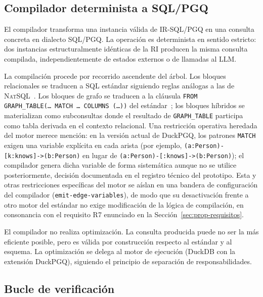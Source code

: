 \subsection{Compilador determinista a SQL/PGQ}
\label{subsec:prop-compilador}

El compilador transforma una instancia válida de IR-SQL/PGQ en una consulta concreta en dialecto \ac{SQL}/\ac{PGQ}. La operación es determinista en sentido estricto: dos instancias estructuralmente idénticas de la \ac{RI} producen la misma consulta compilada, independientemente de estados externos o de llamadas al \ac{LLM}.

La compilación procede por recorrido ascendente del árbol. Los bloques relacionales se traducen a \ac{SQL} estándar siguiendo reglas análogas a las de \textsc{NatSQL}~\cite{gan2021natsql}.
Los bloques de grafo se traducen a la cláusula \texttt{FROM GRAPH\_TABLE(\ldots\ MATCH \ldots\ COLUMNS (\ldots))} del estándar~\cite{DuckPGQ}; los bloques híbridos se materializan como subconsultas donde el resultado de \texttt{GRAPH\_TABLE} participa como tabla derivada en el contexto relacional. Una restricción operativa heredada del motor merece mención: en la versión actual de DuckPGQ, los patrones \texttt{MATCH} exigen una variable explícita en cada arista (por ejemplo, \texttt{(a:Person)-[k:knows]->(b:Person)} en lugar de \texttt{(a:Person)-[:knows]->(b:Person)}); el compilador genera dicha variable de forma sistemática aunque no se utilice posteriormente, decisión documentada en el registro técnico del prototipo. Esta y otras restricciones específicas del motor se aíslan en una bandera de configuración del compilador (\texttt{emit-edge-variables}), de modo que su desactivación frente a otro motor del estándar no exige modificación de la lógica de compilación, en consonancia con el requisito R7 enunciado en la Sección~\ref{sec:prop-requisitos}. %

El compilador no realiza optimización. La consulta producida puede no ser la más eficiente posible, pero es válida por construcción respecto al estándar y al esquema. La optimización se delega al motor de ejecución (DuckDB con la extensión DuckPGQ), siguiendo el principio de separación de responsabilidades.

\subsection{Bucle de verificación}
\label{subsec:prop-verificacion}

